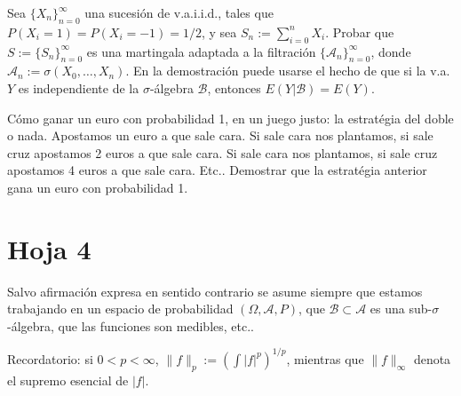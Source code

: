 \begin{problem}[4] Sea $\{X_n\}_{n=0}^{\infty}$ una sucesi\'on de v.a.i.i.d., tales que 
$P(X_i = 1)= P(X_i = -1) = 1/2$, y sea $S_n := \sum_{i=0}^n X_i$.
Probar que $S := \{S_n\}_{n=0}^{\infty}$  es una martingala adaptada a la filtraci\'on
$\{\mathcal{A}_n\}_{n=0}^{\infty}$, donde $\mathcal{A}_n := \sigma(X_0, \dots, X_n)$.
En la demostraci\'on puede usarse el hecho de que si la v.a. $Y$ es independiente
de la $\sigma$-\'algebra $\mathcal{B}$, entonces $E(Y|\mathcal{B}) = E(Y)$.
\solution

\begin{expla}

\end{expla}

\end{problem}


\begin{problem}[5] C\'omo ganar un euro con probabilidad 1, en un juego justo: la estrat\'egia del doble o nada.
Apostamos un euro a que sale cara. Si sale cara nos plantamos, si sale cruz apostamos
2 euros a que sale cara. Si sale cara nos plantamos, si sale cruz apostamos
4 euros a que sale cara. Etc.. Demostrar que la  estrat\'egia anterior gana un euro
 con probabilidad 1.
\solution

\begin{expla}

\end{expla}

\end{problem}




\newpage
\section{Hoja 4}

Salvo afirmaci\'on expresa en sentido
contrario se asume siempre que estamos trabajando en un espacio de probabilidad $(\Omega, \mathcal{A}, P)$,
que  $\mathcal{B}\subset \mathcal{A}$ es una sub-$\sigma$-\'algebra, que las funciones son medibles, etc..

Recordatorio: si $0 < p < \infty$, $\|f\|_p := \left(\int|f|^p\right)^{1/p}$, mientras que
$\|f\|_\infty$ denota el supremo esencial de $|f|$. 

